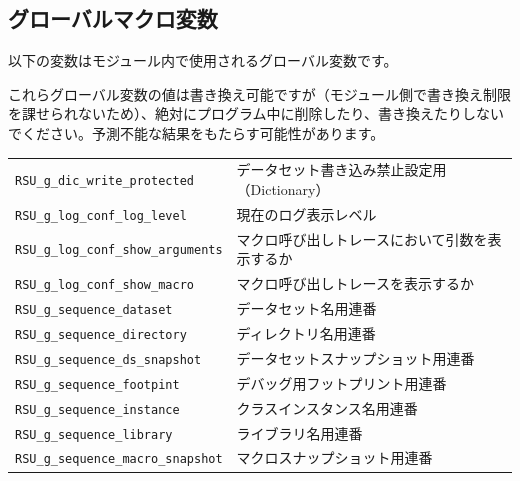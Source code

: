 \section{グローバルマクロ変数}
以下の変数はモジュール内で使用されるグローバル変数です。
\begin{marker}
これらグローバル変数の値は書き換え可能ですが（モジュール側で書き換え制限を課せられないため）、絶対にプログラム中に削除したり、書き換えたりしないでください。予測不能な結果をもたらす可能性があります。
\end{marker}
 
\begin{center}
{\footnotesize
\begin{xltabular}{\textwidth}{|p{5truecm}|X|}
\hline
\thead{\DocStrHeaderGlobalVariableName}&\thead{\DocStrDescription}\\
\hline
\hline
\texttt{RSU\_g\_dic\_write\_protected}&データセット書き込み禁止設定用（Dictionary）\\
\hline
\texttt{RSU\_g\_log\_conf\_log\_level}&現在のログ表示レベル\\
\hline
\texttt{RSU\_g\_log\_conf\_show\_arguments}&マクロ呼び出しトレースにおいて引数を表示するか\\
\hline
\texttt{RSU\_g\_log\_conf\_show\_macro}&マクロ呼び出しトレースを表示するか\\
\hline
\texttt{RSU\_g\_sequence\_dataset}&データセット名用連番\\
\hline
\texttt{RSU\_g\_sequence\_directory}&ディレクトリ名用連番\\
\hline
\texttt{RSU\_g\_sequence\_ds\_snapshot}&データセットスナップショット用連番\\
\hline
\texttt{RSU\_g\_sequence\_footpint}&デバッグ用フットプリント用連番\\
\hline
\texttt{RSU\_g\_sequence\_instance}&クラスインスタンス名用連番\\
\hline
\texttt{RSU\_g\_sequence\_library}&ライブラリ名用連番\\
\hline
\texttt{RSU\_g\_sequence\_macro\_snapshot}&マクロスナップショット用連番\\
\hline
\end{xltabular}
}
\end{center}
 
\chapter{\DocStrTitleRDMPredefinedFormat}
 
